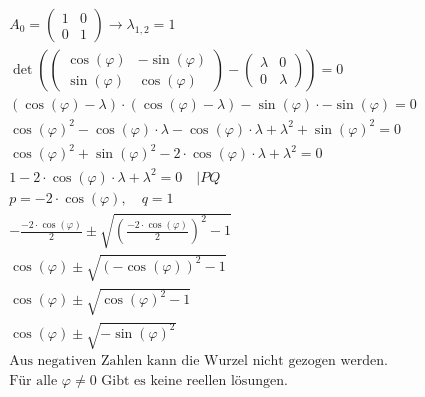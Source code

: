 \begin{align*}
    A_0 = \begin{pmatrix}
              1 & 0 \\
              0 & 1
          \end{pmatrix} \rightarrow \lambda_{1,2} = 1                                                                  \\
    \det\left(\begin{pmatrix}
                      \cos(\varphi) & -\sin(\varphi) \\
                      \sin(\varphi) & \cos(\varphi)
                  \end{pmatrix} - \begin{pmatrix}
                                      \lambda & 0       \\
                                      0       & \lambda
                                  \end{pmatrix}\right) = 0                                                                 \\
    (\cos(\varphi) - \lambda) \cdot (\cos(\varphi) - \lambda) - \sin(\varphi) \cdot -\sin(\varphi) = 0                 \\
    {\cos(\varphi)}^2 - \cos(\varphi) \cdot \lambda - \cos(\varphi) \cdot \lambda  + \lambda^2 + {\sin(\varphi)}^2 = 0 \\
    {\cos(\varphi)}^2 + {\sin(\varphi)}^2 - 2 \cdot \cos(\varphi) \cdot \lambda + \lambda^2 = 0                        \\
    1 - 2 \cdot \cos(\varphi) \cdot \lambda + \lambda^2 = 0 \quad | PQ                                                 \\
    p = - 2 \cdot \cos(\varphi), \quad q = 1                                                                           \\
    -\frac{- 2 \cdot \cos(\varphi)}{2} \pm \sqrt{\left(\frac{- 2 \cdot \cos(\varphi)}{2}\right)^2 - 1}                 \\
    \cos(\varphi)\pm \sqrt{(-\cos(\varphi))^2 - 1}                                                                     \\
    \cos(\varphi)\pm \sqrt{\cos(\varphi)^2 - 1}                                                                        \\
    \cos(\varphi)\pm \sqrt{-\sin(\varphi)^2}                                                                           \\
    \text{Aus negativen Zahlen kann die Wurzel nicht gezogen werden.}                                                  \\
    \text{Für alle } \varphi \neq 0 \text{ Gibt es keine reellen lösungen.}
\end{align*}

